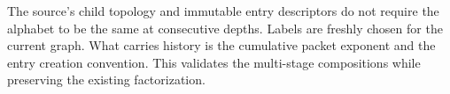\documentclass[11pt,letterpaper]{article}
\theoremstyle{remark}\newtheorem{remark}[theorem]{Remark}
\begin{document}
The source's child topology and immutable entry descriptors do not require
the alphabet to be the same at consecutive depths. Labels are freshly
chosen for the current graph. What carries history is the cumulative
packet exponent and the entry creation convention. This validates the
multi-stage compositions while preserving the existing factorization.





\end{document}

